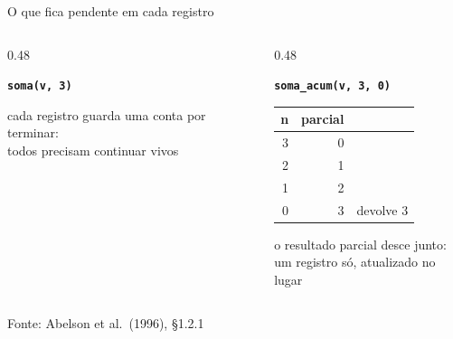 \documentclass[aspectratio=169]{beamer}
\newcommand{\fonte}[1]{\vfill\hfill{\scriptsize\textcolor{UFSGray}{Fonte: #1}}}
\begin{document}
\begin{frame}{O que fica pendente em cada registro}
  \begin{columns}[T]
    \begin{column}{0.48\textwidth}
      \begin{center}
      \textcolor{UFSRed}{\textbf{\texttt{soma(v, 3)}}}\\[0.4em]

      \scriptsize cada registro guarda uma conta por terminar:\\
      todos precisam continuar vivos
      \end{center}
    \end{column}
    \begin{column}{0.48\textwidth}
      \begin{center}
      \textcolor{UFSBlue}{\textbf{\texttt{soma\_acum(v, 3, 0)}}}\\[0.4em]

      \vspace{0.3em}
      {\scriptsize\ttfamily
      \begin{tabular}{rrl}
        n & parcial & \\
        \midrule
        3 & 0 & \\
        2 & 1 & \\
        1 & 2 & \\
        0 & 3 & \textcolor{UFSRed}{devolve 3}
      \end{tabular}}

      \scriptsize o resultado parcial desce junto:\\
      um registro só, atualizado no lugar
      \end{center}
    \end{column}
  \end{columns}
  \fonte{Abelson et al.\ (1996), §1.2.1~\cite{abelson1996structure}}
\end{frame}
\end{document}
